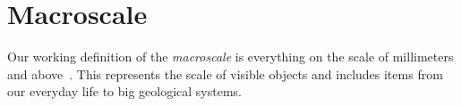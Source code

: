 









\section{Macroscale}\label{sec:macroscale}
Our working definition of the \textit{macroscale} is everything on the scale of millimeters and above~\cite{HUNG2015215}. This represents the scale of visible objects and includes items from our everyday life to big geological systems. 

